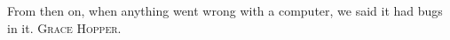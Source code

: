 %
%
%

{
  \epigrafe
  {%
    From then on, when anything went wrong with a computer, we said it had bugs
    in it.%
  }
  {%
     \textsc{Grace Hopper}.%
  }
}

\noindent

